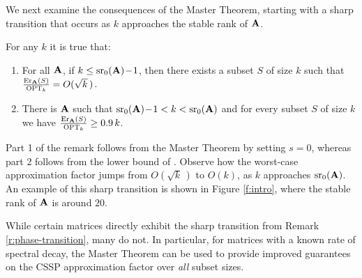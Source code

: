 \documentclass{article}
\begin{document}
We next examine the consequences of
the Master Theorem, starting with a sharp transition that occurs as $k$
approaches the stable rank of $\mathbf A$. 
\begin{remark}\label{r:phase-transition}
For any $k$ it is true that:
  \begin{enumerate}
\item  For all $\mathbf A$, if $k\leq {\mathrm{sr}}_0(\mathbf A)\!-\!1$, then there exists a subset $S$ of size $k$ such that
$\frac{\mathrm{Er}_\mathbf A(S)}{{\textsc{OPT}_k}} = O(\sqrt  k\,)$.
\item There is $\mathbf A$ such that ${\mathrm{sr}}_0(\mathbf A)\!-\!1<k<{\mathrm{sr}}_0(\mathbf A)$ and for every subset $S$ of
  size $k$ we have $\frac{\mathrm{Er}_\mathbf A(S)}{{\textsc{OPT}_k}}
  \geq 0.9\,k$.
  \end{enumerate}
\end{remark}
Part 1 of the remark follows from the Master Theorem by setting
$s=0$, whereas part 2 follows from the lower bound of
\citet{more-efficient-volume-sampling}. Observe how the worst-case
approximation factor jumps from $O(\sqrt k\,)$ to $O(k)$, as $k$
approaches ${\mathrm{sr}}_0(\mathbf A)$. An example of this sharp
transition is shown in Figure \ref{f:intro}, where the stable
rank of $\mathbf A$ is around $20$. 

While certain matrices directly exhibit the sharp transition from
Remark \ref{r:phase-transition}, many do not. In particular, for
matrices with a known rate of spectral decay, the Master Theorem can
be used to provide improved guarantees on the CSSP approximation
factor over \emph{all} subset sizes. 
\end{document}
